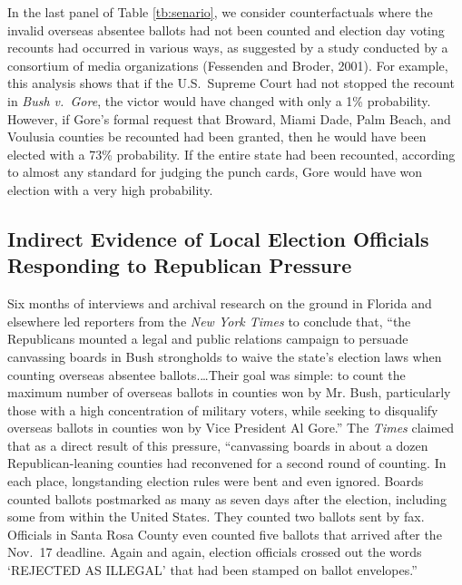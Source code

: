 \documentclass[11pt,titlepage]{article}
\begin{document}
In the last panel of Table \ref{tb:senario}, we consider
counterfactuals where the invalid overseas absentee ballots had not
been counted and election day voting recounts had occurred in various
ways, as suggested by a study conducted by a consortium of media
organizations (Fessenden and Broder, 2001).  For example, this
analysis shows that if the U.S.\ Supreme Court had not stopped the
recount in \emph{Bush v.\ Gore}, the victor would have changed with
only a 1\% probability.  However, if Gore's formal request that
Broward, Miami Dade, Palm Beach, and Voulusia counties be recounted
had been granted, then he would have been elected with a 73\%
probability.  If the entire state had been recounted, according to
almost any standard for judging the punch cards, Gore would have won
election with a very high probability.

\subsection{Indirect Evidence of Local Election Officials Responding
  to Republican Pressure}

Six months of interviews and archival research on the ground in
Florida and elsewhere led reporters from the \emph{New York Times}
to conclude that, ``the Republicans mounted a legal and public
relations campaign to persuade canvassing boards in Bush strongholds
to waive the state's election laws when counting overseas absentee
ballots.\ldots Their goal was simple: to count the maximum number of
overseas ballots in counties won by Mr.  Bush, particularly those with
a high concentration of military voters, while seeking to disqualify
overseas ballots in counties won by Vice President Al Gore.''  The
\emph{Times} claimed that as a direct result of this pressure,
``canvassing boards in about a dozen Republican-leaning counties had
reconvened for a second round of counting.  In each place,
longstanding election rules were bent and even ignored.  Boards
counted ballots postmarked as many as seven days after the election,
including some from within the United States.  They counted two
ballots sent by fax.  Officials in Santa Rosa County even counted five
ballots that arrived after the Nov.\ 17 deadline.  Again and again,
election officials crossed out the words `REJECTED AS ILLEGAL' that
had been stamped on ballot envelopes.''
\end{document}
